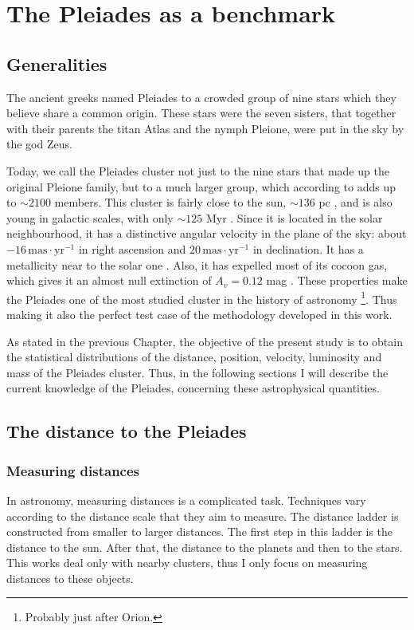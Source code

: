 \chapter{The Pleiades as a benchmark}
\label{chap:pleiades}

\section{Generalities}
\label{sect:generalities}
The ancient greeks named Pleiades to a crowded group of nine stars which they believe share a common origin. These stars were the seven sisters, that together with their parents the titan Atlas and the nymph Pleione, were put in the sky  by the god Zeus.
 
Today, we call the Pleiades cluster not just to the nine stars that made up the original Pleione family, but to a much larger group, which according to \citet{Bouy2015} adds up to $\sim2100$ members. This cluster is fairly close to the sun, $\sim 136$ pc \cite[according to][]{Galli2017}, and is also young in galactic scales, with only $\sim125$ Myr \citep{Stauffer1998}. Since it is located in the solar neighbourhood, it has a distinctive angular velocity in the plane of the sky: about $-16\,\mathrm{mas\cdot yr^{-1}}$ in right ascension and $20\,\mathrm{mas\cdot yr^{-1}}$ in declination. It has a metallicity near to the solar one \cite[{[Fe/H]$\sim$0},][]{Takeda2017}. Also, it has expelled most of its cocoon gas, which gives it an almost null extinction of $A_v=0.12$ mag \citep{Guthrie1987}. These properties make the Pleiades one of the most studied cluster in the history of astronomy \footnote{Probably just after Orion.}. Thus making it also the perfect test case of the methodology developed in this work.

As stated in the previous Chapter,  the objective of the present study is to obtain the statistical distributions of the distance, position, velocity, luminosity and mass of the Pleiades cluster. Thus, in the following sections I will describe the current knowledge of the Pleiades, concerning these astrophysical quantities. 
 
\section{The distance to the Pleiades}

\subsection{Measuring distances}
In astronomy, measuring distances is a complicated task. Techniques vary according to the distance scale that they aim to measure. The distance ladder is constructed from smaller to larger distances. The first step in this ladder is the distance to the sun. After that, the distance to the planets and then to the stars. This works deal only with nearby clusters, thus I only focus on measuring distances to these objects. 

